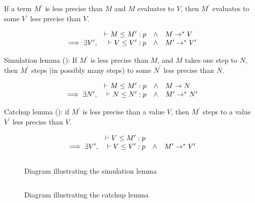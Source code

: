 If a term $M^\prime$ is less precise than $M$ and $M$ evaluates to $V$,
then $M^\prime$ evaluates to some $V^\prime$ less precise than $V$.

\newcommand\wwedge{\quad\wedge\quad}

\[
\begin{array}{rrcl}
  & \vdash M \le M^\prime : p & \wedge & M \to^\ast V
\\ \implies \exists V^\prime , & \vdash V \le V^\prime : p & \wedge & M^\prime \to^\ast V^\prime
\end{array}
\]

Simulation lemma (): If $M^\prime$ is less precise than $M$, and $M$ takes one step to $N$,
then $M^\prime$ steps (in possibly many steps) to some $N^\prime$ less precise than $N$.

\[
\begin{array}{rrcl}
  & \vdash M \le M^\prime : p & \wedge & M \to N
\\ \implies \exists N^\prime , & \vdash N \le N^\prime : p & \wedge & M^\prime \to^\ast N^\prime
\end{array}
\]

Catchup lemma (): if $M^\prime$ is less precise than a value $V$, then $M^\prime$ steps
to a value $V^\prime$ less precise than $V$.

\[
\begin{array}{rrcl}
  & \vdash V \le M^\prime : p & &
\\ \implies \exists V^\prime , & \vdash V \le V^\prime : p & \wedge & M^\prime \to^\ast V^\prime
\end{array}
\]

\begin{figure}
$$

$$
\caption{Diagram illustrating the simulation lemma}
\label{fig:sim}
\end{figure}

\begin{figure}
$$  $$
\caption{Diagram illustrating the catchup lemma}
\label{fig:catchup}
\end{figure}
